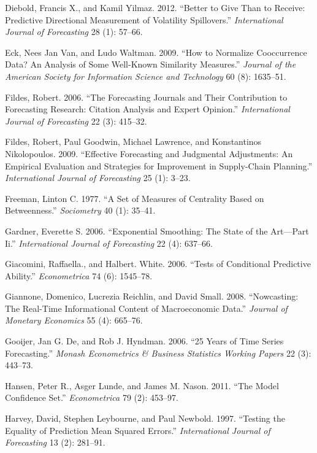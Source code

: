 \documentclass[11pt,a4paper]{elsarticle} %
\begin{document}
\hypertarget{ref-Diebold2012}{}
Diebold, Francis X., and Kamil Yilmaz. 2012. ``Better to Give Than to
Receive: Predictive Directional Measurement of Volatility Spillovers.''
\emph{International Journal of Forecasting} 28 (1): 57--66.

\hypertarget{ref-Eck2009How}{}
Eck, Nees Jan Van, and Ludo Waltman. 2009. ``How to Normalize
Cooccurrence Data? An Analysis of Some Well-Known Similarity Measures.''
\emph{Journal of the American Society for Information Science and
Technology} 60 (8): 1635--51.

\hypertarget{ref-Fildes2006The}{}
Fildes, Robert. 2006. ``The Forecasting Journals and Their Contribution
to Forecasting Research: Citation Analysis and Expert Opinion.''
\emph{International Journal of Forecasting} 22 (3): 415--32.

\hypertarget{ref-Fildes2009}{}
Fildes, Robert, Paul Goodwin, Michael Lawrence, and Konstantinos
Nikolopoulos. 2009. ``Effective Forecasting and Judgmental Adjustments:
An Empirical Evaluation and Strategies for Improvement in Supply-Chain
Planning.'' \emph{International Journal of Forecasting} 25 (1): 3--23.

\hypertarget{ref-Freeman1977}{}
Freeman, Linton C. 1977. ``A Set of Measures of Centrality Based on
Betweenness.'' \emph{Sociometry} 40 (1): 35--41.

\hypertarget{ref-Gardner2006}{}
Gardner, Everette S. 2006. ``Exponential Smoothing: The State of the
Art---Part Ii.'' \emph{International Journal of Forecasting} 22 (4):
637--66.

\hypertarget{ref-Giacomini2006}{}
Giacomini, Raffaella., and Halbert. White. 2006. ``Tests of Conditional
Predictive Ability.'' \emph{Econometrica} 74 (6): 1545--78.

\hypertarget{ref-Giannone2008}{}
Giannone, Domenico, Lucrezia Reichlin, and David Small. 2008.
``Nowcasting: The Real-Time Informational Content of Macroeconomic
Data.'' \emph{Journal of Monetary Economics} 55 (4): 665--76.

\hypertarget{ref-Gooijer200625}{}
Gooijer, Jan G. De, and Rob J. Hyndman. 2006. ``25 Years of Time Series
Forecasting.'' \emph{Monash Econometrics \& Business Statistics Working
Papers} 22 (3): 443--73.

\hypertarget{ref-Hansen2011The}{}
Hansen, Peter R., Asger Lunde, and James M. Nason. 2011. ``The Model
Confidence Set.'' \emph{Econometrica} 79 (2): 453--97.

\hypertarget{ref-Harvey1997Testing}{}
Harvey, David, Stephen Leybourne, and Paul Newbold. 1997. ``Testing the
Equality of Prediction Mean Squared Errors.'' \emph{International
Journal of Forecasting} 13 (2): 281--91.
\end{document}
